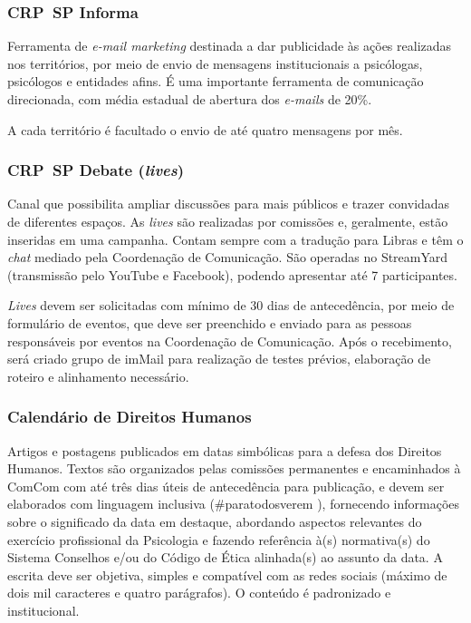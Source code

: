 \subsubsection{CRP~SP Informa}

Ferramenta de \emph{e-mail marketing} destinada a dar publicidade às ações realizadas nos territórios, por meio de envio de mensagens institucionais a psicólogas, psicólogos e entidades afins. É uma importante ferramenta de comunicação direcionada, com média estadual de abertura dos \emph{e-mails} de 20\%.

A cada território é facultado o envio de até quatro mensagens por mês.

\subsubsection{CRP~SP Debate (\emph{lives})}

Canal que possibilita ampliar discussões para mais públicos e trazer convidadas de diferentes espaços. As \emph{lives} são realizadas por comissões e, geralmente, estão inseridas em uma campanha. Contam sempre com a tradução para Libras e têm o \emph{chat} mediado pela Coordenação de Comunicação. São operadas no StreamYard (transmissão pelo YouTube e Facebook), podendo apresentar até 7 participantes.

\emph{Lives} devem ser solicitadas com mínimo de 30 dias de antecedência, por meio de formulário de eventos, que deve ser preenchido e enviado para as pessoas responsáveis por eventos na Coordenação de Comunicação. Após o recebimento, será criado grupo de imMail para realização de testes prévios, elaboração de roteiro e alinhamento necessário.

\subsubsection{Calendário de Direitos Humanos}

Artigos e postagens publicados em datas simbólicas para a defesa dos Direitos Humanos. Textos são organizados pelas comissões permanentes e encaminhados à ComCom com até três dias úteis de antecedência para publicação, e devem ser elaborados com linguagem inclusiva (\#paratodosverem ), fornecendo informações sobre o significado da data em destaque, abordando aspectos relevantes do exercício profissional da Psicologia e fazendo referência à(s) normativa(s) do Sistema Conselhos e/ou do Código de Ética alinhada(s) ao assunto da data. A escrita deve ser objetiva, simples e compatível com as redes sociais (máximo de dois mil caracteres e quatro parágrafos). O conteúdo é padronizado e institucional.

